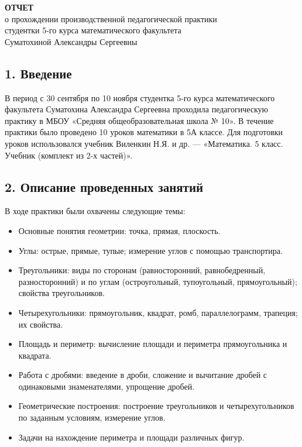 \documentclass[a4paper,12pt]{article}
\begin{document}
\begin{center}
\textbf{ОТЧЕТ}\\
о прохождении производственной педагогической практики\\
студентки 5-го курса математического факультета\\
Суматохиной Александры Сергеевны
\end{center}

\subsection*{1. Введение}

В период с 30 сентября по 10 ноября студентка 5-го курса математического факультета Суматохина Александра Сергеевна проходила педагогическую практику в МБОУ «Средняя общеобразовательная школа № 10». В течение практики было проведено 10 уроков математики в 5А классе. Для подготовки уроков использовался учебник Виленкин Н.Я. и др. — «Математика. 5 класс. Учебник (комплект из 2-х частей)».

\subsection*{2. Описание проведенных занятий}

В ходе практики были охвачены следующие темы:

\begin{itemize}
    \item Основные понятия геометрии: точка, прямая, плоскость.
    \item Углы: острые, прямые, тупые; измерение углов с помощью транспортира.
    \item Треугольники: виды по сторонам (равносторонний, равнобедренный, разносторонний) и по углам (остроугольный, тупоугольный, прямоугольный); свойства треугольников.
    \item Четырехугольники: прямоугольник, квадрат, ромб, параллелограмм, трапеция; их свойства.
    \item Площадь и периметр: вычисление площади и периметра прямоугольника и квадрата.
    \item Работа с дробями: введение в дроби, сложение и вычитание дробей с одинаковыми знаменателями, упрощение дробей.
    \item Геометрические построения: построение треугольников и четырехугольников по заданным условиям, измерение углов.
    \item Задачи на нахождение периметра и площади различных фигур.
\end{itemize}
\end{document}
